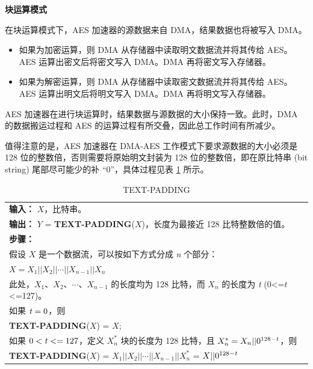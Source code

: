 \documentclass[main\_\_CN.tex]{subfiles}
\begin{document}
\textbf{块运算模式}

在块运算模式下，AES 加速器的源数据来自 DMA，结果数据也将被写入 DMA。
\begin{itemize}
    \item 如果为加密运算，则 DMA 从存储器中读取明文数据流并将其传给 AES。AES 运算出密文后将密文写入 DMA。DMA 再将密文写入存储器。
    \item 如果为解密运算，则 DMA 从存储器中读取密文数据流并将其传给 AES。AES 运算出明文后将明文写入 DMA。DMA 再将明文写入存储器。
\end{itemize}

AES 加速器在进行块运算时，结果数据与源数据的大小保持一致。此时，DMA 的数据搬运过程和 AES 的运算过程有所交叠，因此总工作时间有所减少。

\label{api:testpadding}值得注意的是，AES 加速器在 DMA-AES 工作模式下要求源数据的大小必须是 128 位的整数倍，否则需要将原始明文封装为 128 位的整数倍，即在原比特串 (bit string) 尾部尽可能少的补 “0”，具体过程见表 \ref{tab:aes-define-func-text-padding} 所示。

\begin{longtable}[c]{|p{15cm}|}
\caption{TEXT-PADDING} 
\label{tab:aes-define-func-text-padding}\\
\hline
\rowcolor{lightgray}
\multirow{1}{*}{%
{\bfseries 函数：} {\bfseries TEXT-PADDING}(\ ) } \\\hline
{\bfseries 输入：} $X$，比特串。\\
{\bfseries 输出：} $Y$ = {\bfseries TEXT-PADDING}($X$)，长度为最接近 128 比特整数倍的值。\\\hline
{\bfseries 步骤：}\\
\hspace{1.15cm} 假设 $X$ 是一个数据流，可以按如下方式分成 {\it{n}} 个部分：\\
\phantom{aaaaaaaa}$X = X_{1} || X_{2} || \cdots || X_{n-1} || X_{n}$ \\
\phantom{aaaaaaaa}此处，$X_{1}、X_{2}、\cdots、X_{n-1}$ 的长度均为 128 比特，而 $X_{n}$ 的长度为 {\it{t}} (0<=$t$<=127)。\\
\phantom{aaaaaaaa}如果 ${\it{t}} = 0$，则\\
\phantom{aaaaaaaa}\phantom{空空空空空} {\bfseries TEXT-PADDING}($X$) = $X$;\\
\phantom{aaaaaaaa}如果 $0<{\it{t}} <= 127$，定义 $X_{n}^{*}$ 块的长度为 128 比特，且 $X_{n}^{*} = X_{n} || 0^{128-{\it{t}}}$，则\\
\phantom{aaaaaaaa}\phantom{空空空空空} {\bfseries TEXT-PADDING}($X$) = $X_{1} || X_{2} || \cdots || X_{n-1} || X_{n}^{*}$  = $X || 0^{128-{\it{t}}}$\\
\hline
\end{longtable}
\end{document}

